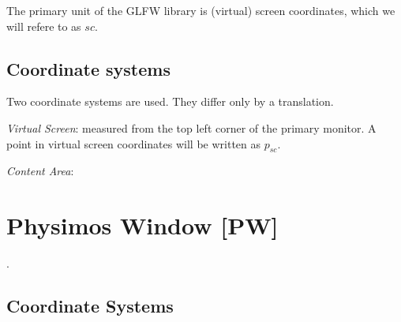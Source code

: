 \documentclass[12pt]{article}
\begin{document}
The primary unit of the GLFW library is (virtual) screen coordinates, which we will refere to as $sc$.


\subsection{Coordinate systems}

Two coordinate systems are used. They differ only by a translation. 

\textit{Virtual Screen}: measured from the top left corner of the primary monitor. A point in virtual screen coordinates will be written as $p_{sc}$.

\textit{Content Area}: 




\section{Physimos Window [PW]}

\LaTeXe.

\subsection{Coordinate Systems}
\end{document}
